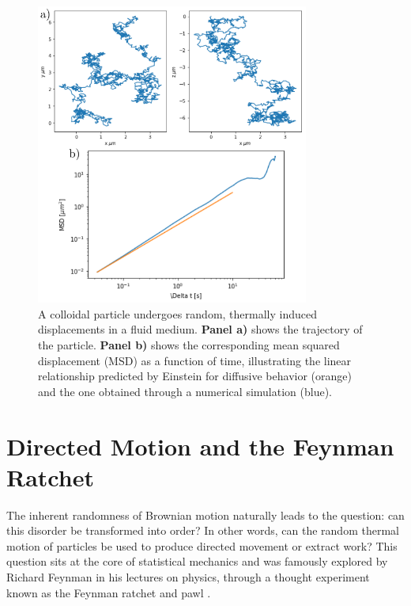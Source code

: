 \begin{figure}[H]
  \begin{center}
    \includegraphics[width=0.8\textwidth]{figures/passivebrowniantrajectorymsd.png}
  \end{center}
  \caption[Example of brownian motion]{A colloidal particle undergoes random, thermally induced displacements in a fluid medium. \textbf{Panel a)} shows the trajectory of the particle. \textbf{ Panel b)} shows the corresponding mean squared displacement (MSD) as a function of time, illustrating the linear relationship predicted by Einstein for diffusive behavior (orange) and the one obtained through a numerical simulation (blue).}\label{fig:passivebrowniantrajectory}
\end{figure}

\section{Directed Motion and the Feynman Ratchet}

The inherent randomness of Brownian motion naturally leads to the question: can this disorder be transformed into order? In other words, can the random thermal motion of particles be used to produce directed movement or extract work? This question sits at the core of statistical mechanics and was famously explored by Richard Feynman in his lectures on physics, through a thought experiment known as the Feynman ratchet and pawl \cite{feynman1963feynman}.

